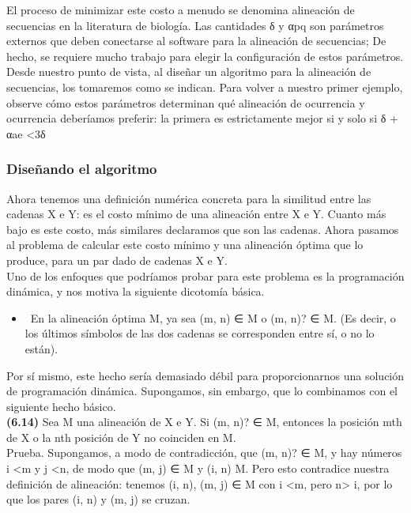 \documentclass[a4paper]{article}
\begin{document}
El proceso de minimizar este costo a menudo se denomina alineación de secuencias en la literatura de biología. Las cantidades δ y {αpq} son parámetros externos que deben conectarse al software para la alineación de secuencias; De hecho, se requiere mucho trabajo para elegir la configuración de estos parámetros. Desde nuestro punto de vista, al diseñar un algoritmo para la alineación de secuencias, los tomaremos como se indican. Para volver a nuestro primer ejemplo, observe cómo estos parámetros determinan qué alineación de ocurrencia y ocurrencia deberíamos preferir: la primera es estrictamente mejor si y solo si δ + αae <3δ\\


\subsubsection*{Diseñando el algoritmo}

Ahora tenemos una definición numérica concreta para la similitud entre las cadenas X e Y: es el costo mínimo de una alineación entre X e Y. Cuanto más bajo es este costo, más similares declaramos que son las cadenas. Ahora pasamos al problema de calcular este costo mínimo y una alineación óptima que lo produce, para un par dado de cadenas X e Y.\\

Uno de los enfoques que podríamos probar para este problema es la programación dinámica, y nos motiva la siguiente dicotomía básica.\\
\begin{itemize}
    \item  En la alineación óptima M, ya sea (m, n) ∈ M o (m, n)? ∈ M. (Es decir, o los últimos símbolos de las dos cadenas se corresponden entre sí, o no lo están).
\end{itemize}

Por sí mismo, este hecho sería demasiado débil para proporcionarnos una solución de programación dinámica. Supongamos, sin embargo, que lo combinamos con el siguiente hecho básico.\\

\textbf{(6.14)} Sea M una alineación de X e Y. Si (m, n)? ∈ M, entonces la posición mth de X o la nth posición de Y no coinciden en M.\\

Prueba. Supongamos, a modo de contradicción, que (m, n)? ∈ M, y hay números i <m y j <n, de modo que (m, j) ∈ M y (i, n) M. Pero esto contradice nuestra definición de alineación: tenemos (i, n), (m, j) ∈ M con i <m, pero n> i, por lo que los pares (i, n) y (m, j) se cruzan.\\
\end{document}
